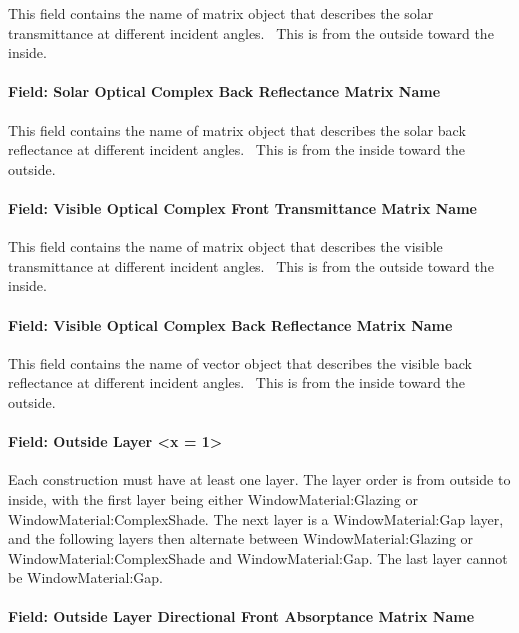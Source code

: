 This field contains the name of matrix object that describes the solar transmittance at different incident angles.~ This is from the outside toward the inside.

\paragraph{Field: Solar Optical Complex Back Reflectance Matrix Name}\label{field-solar-optical-complex-back-reflectance-matrix-name}

This field contains the name of matrix object that describes the solar back reflectance at different incident angles.~ This is from the inside toward the outside.

\paragraph{Field: Visible Optical Complex Front Transmittance Matrix Name}\label{field-visible-optical-complex-front-transmittance-matrix-name}

This field contains the name of matrix object that describes the visible transmittance at different incident angles.~ This is from the outside toward the inside.

\paragraph{Field: Visible Optical Complex Back Reflectance Matrix Name}\label{field-visible-optical-complex-back-reflectance-matrix-name}

This field contains the name of vector object that describes the visible back reflectance at different incident angles.~ This is from the inside toward the outside.

\paragraph{Field: Outside Layer \textless{}x = 1\textgreater{}}\label{field-outside-layer-x-1}

Each construction must have at least one layer. The layer order is from outside to inside, with the first layer being either WindowMaterial:Glazing or WindowMaterial:ComplexShade. The next layer is a WindowMaterial:Gap layer, and the following layers then alternate between WindowMaterial:Glazing or WindowMaterial:ComplexShade and WindowMaterial:Gap. The last layer cannot be WindowMaterial:Gap.

\paragraph{Field: Outside Layer Directional Front Absorptance Matrix Name}\label{field-outside-layer-directional-front-absorptance-matrix-name}


